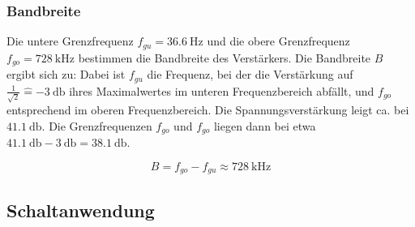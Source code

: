 \documentclass[
	a4paper, %
	12pt, %
]{CSUniSchoolLabReport}
\begin{document}
\subsubsection{Bandbreite}
Die untere Grenzfrequenz $f_{gu} = \SI{36.6}{\hertz}$ und die obere Grenzfrequenz $f_{go} = \SI{728}{\kilo\hertz}$ bestimmen die Bandbreite des Verstärkers. Die Bandbreite $B$ ergibt sich zu:
Dabei ist $f_{gu}$ die Frequenz, bei der die Verstärkung auf $\frac{1}{\sqrt{2}} \hat{=}\SI{-3}{\decibel}$ ihres Maximalwertes im unteren Frequenzbereich abfällt, und $f_{go}$ entsprechend im oberen Frequenzbereich.
Die Spannungsverstärkung leigt ca. bei $\SI{41.1}{\decibel}$. Die Grenzfrequenzen $f_{go}$ und $f_{go}$ liegen dann bei etwa $\SI{41.1}{\decibel} - \SI{3}{\decibel} = \SI{38.1}{\decibel}$.

\[
B = f_{go} - f_{gu} \approx \SI{728}{\kilo\hertz}
\]

\subsection{Schaltanwendung}
\end{document}

